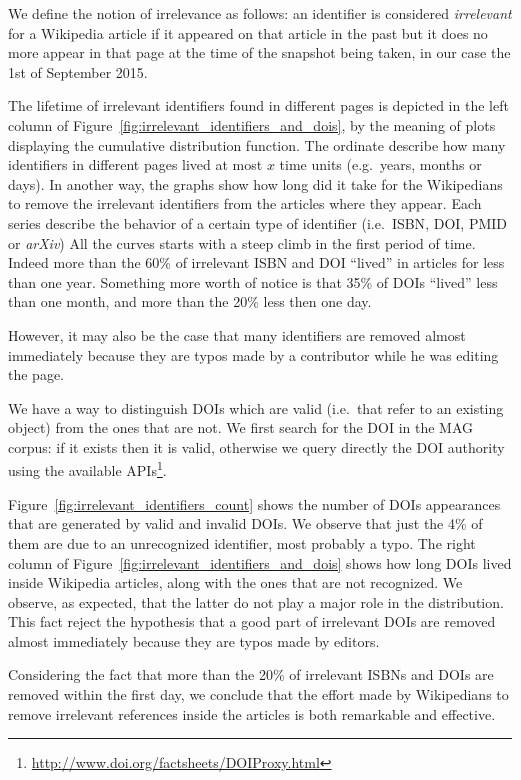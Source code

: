 We define the notion of irrelevance as follows: an identifier is considered \emph{irrelevant} for a Wikipedia article if it appeared on that article in the past but it does no more appear in that page at the time of the snapshot being taken, in our case the 1st of September 2015.

The lifetime of irrelevant identifiers found in different pages is depicted in the left column of Figure~\ref{fig:irrelevant_identifiers_and_dois}, by the meaning of plots displaying the cumulative distribution function.
The ordinate describe how many identifiers in different pages lived at most $x$ time units (e.g.\ years, months or days).
In another way, the graphs show how long did it take for the Wikipedians to remove the irrelevant identifiers from the articles where they appear.
Each series describe the behavior of a certain type of identifier (i.e.\ \ac{ISBN}, \ac{DOI}, \ac{PMID} or \emph{arXiv})
All the curves starts with a steep climb in the first period of time.
Indeed more than the 60\% of irrelevant \ac{ISBN} and \ac{DOI} ``lived'' in articles for less than one year.
Something more worth of notice is that 35\% of \acp{DOI} ``lived'' less than one month, and more than the 20\% less then one day.

However, it may also be the case that many identifiers are removed almost immediately because they are typos made by a contributor while he was editing the page.

We have a way to distinguish \acp{DOI} which are valid (i.e.\ that refer to an existing object) from the ones that are not.
We first search for the DOI in the MAG corpus: if it exists then it is valid, otherwise we query directly the DOI authority using the available APIs\footnote{\url{http://www.doi.org/factsheets/DOIProxy.html}}.


Figure~\ref{fig:irrelevant_identifiers_count} shows the number of \acp{DOI} appearances that are generated by valid and invalid DOIs.
We observe that just the 4\% of them are due to an unrecognized identifier, most probably a typo.
The right column of Figure~\ref{fig:irrelevant_identifiers_and_dois} shows how long DOIs lived inside Wikipedia articles, along with the ones that are not recognized.
We observe, as expected, that the latter do not play a major role in the distribution.
This fact reject the hypothesis that a good part of irrelevant DOIs are removed almost immediately because they are typos made by editors.

Considering the fact that more than the 20\% of irrelevant \acp{ISBN} and \acp{DOI} are removed within the first day, we conclude that the effort made by Wikipedians to remove irrelevant references inside the articles is both remarkable and effective.

